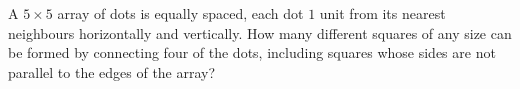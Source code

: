 A \(5\times 5\) array of dots is equally spaced, each dot \(1\) unit from its nearest neighbours horizontally and vertically. How many different squares of any size can be formed by connecting four of the dots, including squares whose sides are not parallel to the edges of the array?
